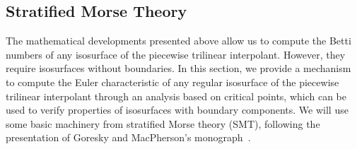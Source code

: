 \subsection{Stratified Morse Theory}
\label{sec:smt}
The mathematical developments presented above allow us to compute the
Betti numbers of any isosurface of the piecewise trilinear
interpolant.  However, they require isosurfaces without boundaries.
In this section, we provide a mechanism to compute the Euler
characteristic of any regular isosurface of the piecewise trilinear
interpolant through an analysis based on critical points, which can be
used to verify properties of isosurfaces with boundary components.  We
will use some basic machinery from stratified Morse theory (SMT),
following the presentation of Goresky and MacPherson's
monograph~\cite{Goresky:1988:SMT}.

